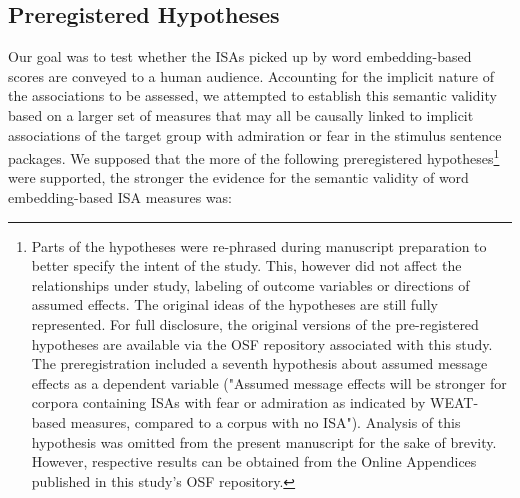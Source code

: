 \subsection{Preregistered Hypotheses}

Our goal was to test whether the ISAs picked up by word embedding-based scores are conveyed to a human audience. Accounting for the implicit nature of the associations to be assessed, we attempted to establish this semantic validity based on a larger set of measures that may all be causally linked to implicit associations of the target group with admiration or fear in the stimulus sentence packages. We supposed that the more of the following preregistered hypotheses\footnote{Parts of the hypotheses were re-phrased during manuscript preparation to better specify the intent of the study. This, however did not affect the relationships under study, labeling of outcome variables or directions of assumed effects. The original ideas of the hypotheses are still fully represented. For full disclosure, the original versions of the pre-registered hypotheses are available via the OSF repository associated with this study. The preregistration included a seventh hypothesis about assumed message effects as a dependent variable ("Assumed message effects will be stronger for corpora containing ISAs with fear or admiration as indicated by WEAT-based measures, compared to a corpus with no ISA"). Analysis of this hypothesis was omitted from the present manuscript for the sake of brevity. However, respective results can be obtained from the Online Appendices published in this study's OSF repository.} were supported, the stronger the evidence for the semantic validity of word embedding-based ISA measures was:

